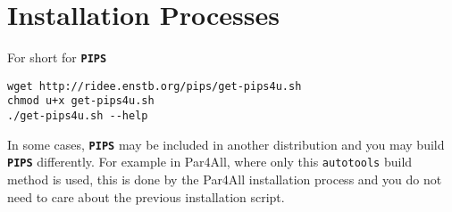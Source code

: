 \documentclass[a4paper]{article}
\newcommand{\PIPS}{\textbf{\texttt{PIPS}}}
\begin{document}
\section{Installation Processes}
\label{sec:install}

For short for \PIPS{}
\begin{lstlisting}
wget http://ridee.enstb.org/pips/get-pips4u.sh
chmod u+x get-pips4u.sh
./get-pips4u.sh --help
\end{lstlisting}

In some cases, \PIPS{} may be included in another distribution and you may
build \PIPS{} differently. For example in Par4All, where only this
\texttt{autotools} build method is used, this is done by the Par4All
installation process and you do not need to care about the previous
installation script.

\begin{acronym}
\end{acronym}
\end{document}

